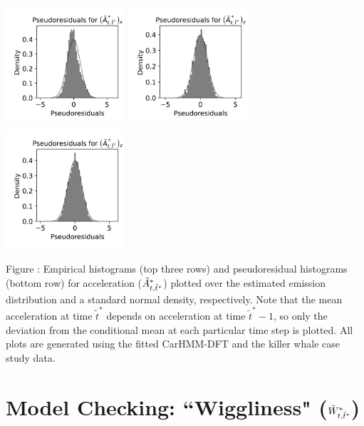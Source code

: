 \documentclass{article}
\begin{document}
\begin{center}
        \includegraphics[width=1.75in]{../Plots/2019/20190902-182840-CATs_OB_1_0_267_CarHMM_pseudresids_Ax.png}
        \includegraphics[width=1.75in]{../Plots/2019/20190902-182840-CATs_OB_1_0_267_CarHMM_pseudresids_Ay.png}
        \includegraphics[width=1.75in]{../Plots/2019/20190902-182840-CATs_OB_1_0_267_CarHMM_pseudresids_Az.png}
        \end{center}
        
        \noindent Figure : Empirical histograms (top three rows) and pseudoresidual histograms (bottom row) for acceleration ($\tilde{A}^*_{t,\tilde t^*}$) plotted over the estimated emission distribution and a standard normal density, respectively. Note that the mean acceleration at time $\tilde t^*$ depends on acceleration at time $\tilde t^*-1$, so only the deviation from the conditional mean at each particular time step is plotted. All plots are generated using the fitted CarHMM-DFT and the killer whale case study data.
        \addtocounter{fignum}{1}
        
    \section{Model Checking: ``Wiggliness" ($\tilde{W}^*_{t,\tilde t^*}$)}
        
\end{document}
